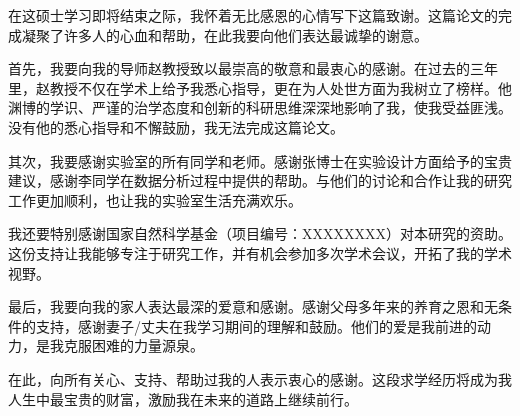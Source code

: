 \acknowledgments

在这硕士学习即将结束之际，我怀着无比感恩的心情写下这篇致谢。这篇论文的完成凝聚了许多人的心血和帮助，在此我要向他们表达最诚挚的谢意。

首先，我要向我的导师赵教授致以最崇高的敬意和最衷心的感谢。在过去的三年里，赵教授不仅在学术上给予我悉心指导，更在为人处世方面为我树立了榜样。他渊博的学识、严谨的治学态度和创新的科研思维深深地影响了我，使我受益匪浅。没有他的悉心指导和不懈鼓励，我无法完成这篇论文。

其次，我要感谢实验室的所有同学和老师。感谢张博士在实验设计方面给予的宝贵建议，感谢李同学在数据分析过程中提供的帮助。与他们的讨论和合作让我的研究工作更加顺利，也让我的实验室生活充满欢乐。

我还要特别感谢国家自然科学基金（项目编号：XXXXXXXX）对本研究的资助。这份支持让我能够专注于研究工作，并有机会参加多次学术会议，开拓了我的学术视野。

最后，我要向我的家人表达最深的爱意和感谢。感谢父母多年来的养育之恩和无条件的支持，感谢妻子/丈夫在我学习期间的理解和鼓励。他们的爱是我前进的动力，是我克服困难的力量源泉。

在此，向所有关心、支持、帮助过我的人表示衷心的感谢。这段求学经历将成为我人生中最宝贵的财富，激励我在未来的道路上继续前行。
